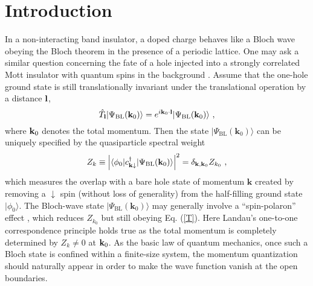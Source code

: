 \documentclass[aps,prb,twocolumn,notitlepage,superscriptaddress,showpacs]{revtex4-1}
\begin{document}
\section{Introduction}

In a non-interacting band insulator, a doped charge behaves like a Bloch wave obeying the Bloch theorem in the presence of a periodic lattice. One may ask a similar question concerning the fate of a hole injected into a strongly correlated Mott insulator with quantum spins in the background \cite{Anderson,Lee2006}. Assume that the one-hole ground state is still translationally invariant under the translational operation by a distance ${\textbf l}$,
\begin{equation}\label{T}
\hat{T}_{\textbf{l}}|\Psi_{\mathrm {BL}}({ \textbf{k}_0}) \rangle=e^{i{\textbf k}_0\cdot {\textbf l}}|\Psi_{\mathrm {BL}}({ \textbf{k}_0})  \rangle ~,
\end{equation}
where ${\textbf k}_0$ denotes the total momentum. Then the state $|\Psi_{\mathrm {BL}}({ \textbf{k}_0})\rangle$ can be uniquely specified by the quasiparticle spectral weight
\begin{equation}\label{zk}
Z_k \equiv  \left |\langle \phi_0|c^{\dagger}_{{\textbf k}\downarrow} |\Psi_{\mathrm {BL}}({ \textbf{k}}_0) \rangle \right |^2
=\delta_{{\textbf k}, {\textbf k}_0} Z_{k_0} ~,
\end{equation}
which measures the overlap with a bare hole state of momentum ${\textbf{k}}$ created by removing a $\downarrow$ spin (without loss of generality) from the half-filling ground state $|\phi_0\rangle $. The Bloch-wave state $|\Psi_{\mathrm {BL}}({ \textbf{k}_0}) \rangle$ may generally involve a ``spin-polaron'' effect  \cite{Lee2006,SCBA1,SCBA2,SCBA3,SCBA4}, which reduces $Z_{k_0}$ but still obeying Eq. (\ref{T}).
Here Landau's one-to-one correspondence principle \cite{Andersonbook} holds true as the total momentum is completely determined by $Z_k\neq 0$ at ${\textbf k}_0$.  As the basic law of quantum mechanics, once such a Bloch state is confined within a finite-size system, the momentum quantization should naturally appear in order to make the wave function vanish at the open boundaries.
\end{document}
